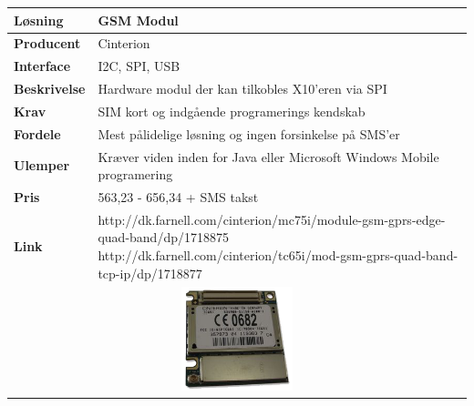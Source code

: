 \begin{table}[H] \centering
	\label{tab:GSM1}
\begin{tabular}{|p{6cm}|p{8cm}|}
	\hline
		\textbf{Løsning}				&GSM Modul \\ \hline
		\textbf{Producent} 			&Cinterion \\ \hline
		\textbf{Interface} 			&I2C, SPI, USB \\ \hline
		\textbf{Beskrivelse} 		&Hardware modul der kan tilkobles X10'eren via SPI \\ \hline
		\textbf{Krav} 				&SIM kort og indgående programerings kendskab \\ \hline
		\textbf{Fordele}				&Mest pålidelige løsning og ingen forsinkelse på SMS'er \\ \hline
		\textbf{Ulemper} 			&Kræver viden inden for Java eller Microsoft Windows Mobile programering \\ \hline
		\textbf{Pris} 				&563,23 - 656,34 + SMS takst \\ \hline
		\textbf{Link} 				&http://dk.farnell.com/cinterion/mc75i/module-gsm-gprs-edge-quad-band/dp/1718875 \newline
									 http://dk.farnell.com/cinterion/tc65i/mod-gsm-gprs-quad-band-tcp-ip/dp/1718877 \\ \hline
		\multicolumn{2}{|c|}{\includegraphics[height=3cm]{billeder/GSM_TC65I}} 	
\\ \hline

\end{tabular}
\end{table}

